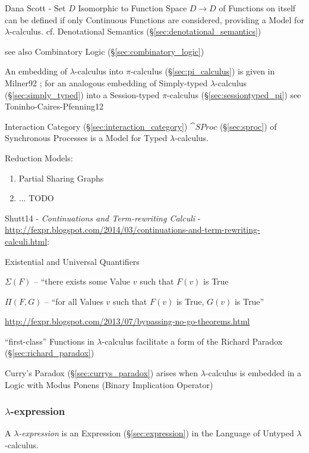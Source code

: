 Dana Scott - Set $D$ Isomorphic to Function Space $D \rightarrow D$ of
Functions on itself can be defined if only Continuous Functions are
considered, providing a Model for $\lambda$-calculus. cf. Denotational
Semantics (\S\ref{sec:denotational_semantics})

\fist see also Combinatory Logic (\S\ref{sec:combinatory_logic})

\fist An embedding of $\lambda$-calculus into $\pi$-calculus
(\S\ref{sec:pi_calculus}) is given in Milner92 \cite{milner92}; for an
analogous embedding of Simply-typed $\lambda$-calculus
(\S\ref{sec:simply_typed}) into a Session-typed $\pi$-calculus
(\S\ref{sec:sessiontyped_pi}) see Toninho-Caires-Pfenning12
\cite{caires-pfenning-toninho12}

Interaction Category (\S\ref{sec:interaction_category}) $\cat{SProc}$
(\S\ref{sec:sproc}) of Synchronous Processes is a Model for Typed
$\lambda$-calculus.

Reduction Models:
\begin{enumerate}
  \item Partial Sharing Graphs
  \item ... TODO
\end{enumerate}


Shutt14 - \emph{Continuations and Term-rewriting Calculi} -
\url{http://fexpr.blogspot.com/2014/03/continuations-and-term-rewriting-calculi.html}:

Existential and Universal Quantifiers

$\Sigma(F)$ -- ``there exists some Value $v$ such that $F(v)$ is True

$\Pi(F,G)$ -- ``for all Values $v$ such that $F(v)$ is True, $G(v)$ is
True''

\url{http://fexpr.blogspot.com/2013/07/bypassing-no-go-theorems.html}

``first-class'' Functions in $\lambda$-calculus facilitate a form of
the Richard Paradox (\S\ref{sec:richard_paradox})

Curry's Paradox (\S\ref{sec:currys_paradox}) arises when
$\lambda$-calculus is embedded in a Logic with Modus Ponens (Binary
Implication Operator)



\subsubsection{$\lambda$-expression}\label{sec:lambda_expression}

A \emph{$\lambda$-expression} is an Expression
(\S\ref{sec:expression}) in the Language of Untyped
$\lambda$-calculus.

